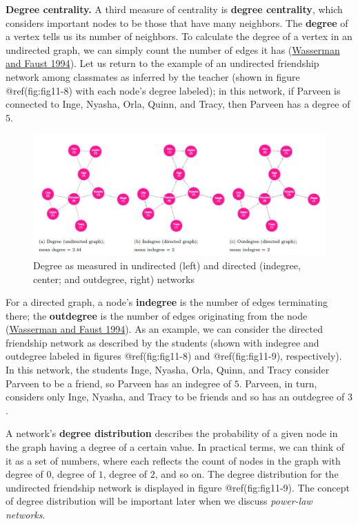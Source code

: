 \documentclass{book}
\begin{document}
\textbf{Degree centrality.} A third measure of centrality is \textbf{degree
centrality}, which considers important nodes to be those that have many
neighbors. The \textbf{degree} of a vertex tells us its number of neighbors.
To calculate the degree of a vertex in an undirected graph, we can simply
count the number of edges it has
(\protect\hyperlink{ref-WassermanFaust1994}{Wasserman and Faust 1994}). Let us
return to the example of an undirected friendship network among classmates as
inferred by the teacher (shown in figure @ref(fig:fig11-8) with each node's
degree labeled); in this network, if Parveen is connected to Inge, Nyasha,
Orla, Quinn, and Tracy, then Parveen has a degree of \(5\).

\begin{figure}
\hypertarget{fig:11-8}{%
\centering
\includegraphics{images/social-networks/11-8.png}
\caption{Degree as measured in undirected (left) and directed (indegree,
center; and outdegree, right) networks}\label{fig:11-8}
}
\end{figure}

For a directed graph, a node's \textbf{indegree} is the number of edges
terminating there; the \textbf{outdegree} is the number of edges originating
from the node (\protect\hyperlink{ref-WassermanFaust1994}{Wasserman and Faust
1994}). As an example, we can consider the directed friendship network as
described by the students (shown with indegree and outdegree labeled in
figures @ref(fig:fig11-8) and @ref(fig:fig11-9), respectively). In this
network, the students Inge, Nyasha, Orla, Quinn, and Tracy consider Parveen to
be a friend, so Parveen has an indegree of \(5\). Parveen, in turn, considers
only Inge, Nyasha, and Tracy to be friends and so has an outdegree of \(3\).

A network's \textbf{degree distribution} describes the probability of a given
node in the graph having a degree of a certain value. In practical terms, we
can think of it as a set of numbers, where each reflects the count of nodes in
the graph with degree of \(0\), degree of \(1\), degree of \(2\), and so on.
The degree distribution for the undirected friendship network is displayed in
figure @ref(fig:fig11-9). The concept of degree distribution will be important
later when we discuss \emph{power-law networks}.
\end{document}
